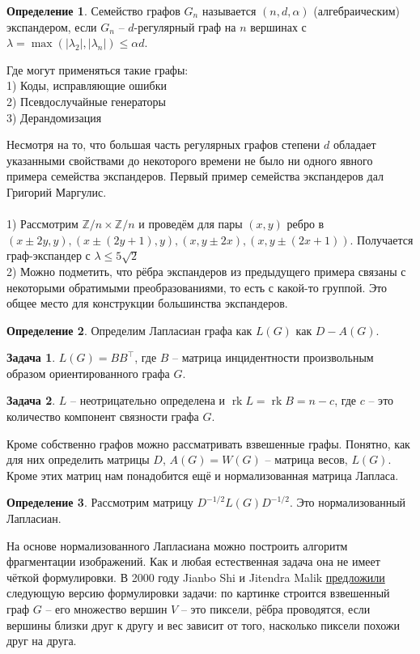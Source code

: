 \documentclass[10pt,a4paper,oneside]{book}
\theoremstyle{definition}
\newtheorem{zad}{\color{violet!100!black}Задача}
\newtheorem*{defn}{\color{yellow!30!red} Определение}
\renewcommand{\leq}{\leqslant}
\newcommand{\mb}[1]{\mathbb{#1}}
\newcommand{\rk}{\operatorname{rk}}
\def\exm{\noindent {\bf Примеры:}}
\def\dfn{\begin{defn}}
\def\edfn{\end{defn}}
\def\zd{\begin{zad}}
\def\ezd{\end{zad}}
\begin{document}
\dfn Семейство графов $G_n$ называется $(n,d,\alpha)$ (алгебраическим) экспандером, если $G_n$ -- $d$-регулярный граф на $n$ вершинах с $\lambda=\max(|\lambda_2|,|\lambda_n|)\leq \alpha d$.
\edfn

Где могут применяться такие графы:\\
1) Коды, исправляющие ошибки\\
2) Псевдослучайные генераторы\\
3) Дерандомизация

Несмотря на то, что большая часть регулярных графов степени $d$ обладает указанными свойствами  до некоторого времени не было ни одного явного примера семейства экспандеров. Первый пример семейства экспандеров дал Григорий Маргулис. \\


\exm\\
1) Рассмотрим $\mb Z/n \times \mb Z/n$ и проведём для пары $(x,y)$ ребро в $(x \pm 2y,y), (x \pm (2y+1),y), (x,y \pm 2x), (x,y \pm (2x+1))$. Получается граф-экспандер с $\lambda \leq 5\sqrt{2}$\\
2) Можно подметить, что рёбра экспандеров из предыдущего примера связаны с некоторыми обратимыми преобразованиями, то есть с какой-то группой. Это общее место для конструкции большинства экспандеров.



\dfn Определим Лапласиан графа как $L(G)$ как $D-A(G)$.
\edfn

\zd $L(G)=B B^\top$, где $B$ -- матрица инцидентности произвольным образом ориентированного графа $G$.
\ezd

\zd $L$ -- неотрицательно определена и  $\rk L= \rk B=n-c$, где $c$ -- это количество компонент связности графа $G$.
\ezd



Кроме собственно графов можно рассматривать взвешенные графы. Понятно, как для них определить матрицы $D$, $A(G)=W(G)$ -- матрица весов, $L(G)$. Кроме этих матриц нам понадобится ещё и нормализованная матрица Лапласа.


\dfn Рассмотрим матрицу $D^{-1/2} L(G) D^{-1/2}$. Это нормализованный Лапласиан.
\edfn

На основе нормализованного Лапласиана можно построить алгоритм фрагментации изображений. Как и любая естественная задача она не имеет чёткой формулировки. В 2000 году Jianbo Shi и  Jitendra Malik \href{https://people.eecs.berkeley.edu/~malik/papers/SM-ncut.pdf}{предложили} следующую версию формулировки задачи: по картинке строится взвешенный граф $G$  -- его множество вершин $V$ -- это пиксели, рёбра проводятся, если вершины близки друг к другу и вес зависит от того, насколько пиксели похожи друг на друга.
\end{document}
